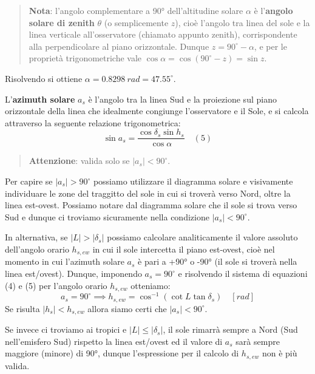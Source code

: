 \documentclass[11pt]{article}
\begin{document}
    \begin{quote}
\textbf{Nota}: l'angolo complementare a 90° dell'altitudine solare
\(\alpha\) è l'\textbf{angolo solare di zenith} \(\theta\) (o
semplicemente \(z\)), cioè l'angolo tra linea del sole e la linea
verticale all'osservatore (chiamato appunto zenith), corrispondente alla
perpendicolare al piano orizzontale. Dunque \(z=90^{{\circ}}-\alpha\), e
per le proprietà trigonometriche vale
\(\cos \alpha = \cos(90^{{\circ}}-z) = \sin z\).
\end{quote}
 
            
    
    Risolvendo si ottiene \(\alpha = 0.8298\ rad=47.55^{\circ}\).

    

    L'\textbf{azimuth solare} \(a_s\) è l'angolo tra la linea Sud e la
proiezione sul piano orizzontale della linea che idealmente congiunge
l'osservatore e il Sole, e si calcola attraverso la seguente relazione
trigonometrica:
\[\sin a_s  = \frac{\cos \delta_s \sin h_s}{\cos \alpha } \quad (5)\]

    \begin{quote}
\textbf{Attenzione}: valida solo se \(|a_s|<90^{{\circ}}\).
\end{quote}

    Per capire se \(|a_s|>90^{{\circ}}\) possiamo utilizzare il diagramma
solare e visivamente individuare le zone del traggitto del sole in cui
si troverà verso Nord, oltre la linea est-ovest. Possiamo notare dal
diagramma solare che il sole si trova verso Sud e dunque ci troviamo
sicuramente nella condizione \(|a_s|<90^{{\circ}}\).

In alternativa, se \(|L|>|\delta_s|\) possiamo calcolare analiticamente
il valore assoluto dell'angolo orario \(h_{s,ew}\) in cui il sole
intercetta il piano est-ovest, cioè nel momento in cui l'azimuth solare
\(a_s\) è pari a +90° o -90° (il sole si troverà nella linea est/ovest).
Dunque, imponendo \(a_s=90^{{\circ}}\) e risolvendo il sistema di
equazioni (4) e (5) per l'angolo orario \(h_{s,ew}\) otteniamo:
\[a_s = 90^{{\circ}} \implies h_{s,ew} = \cos^{-1}\left(\cot L \tan \delta_s \right) \quad [rad]\]
Se risulta \(|h_s|<h_{s,ew}\) allora siamo certi che
\(|a_s|<90^{{\circ}}\).

Se invece ci troviamo ai tropici e \(|L|\leq|\delta_s|\), il sole
rimarrà sempre a Nord (Sud nell'emisfero Sud) rispetto la linea
est/ovest ed il valore di \(a_s\) sarà sempre maggiore (minore) di 90°,
dunque l'espressione per il calcolo di \(h_{s,ew}\) non è più valida.
\end{document}

